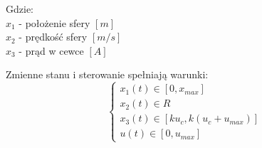 Gdzie:
\\$x_{1}$ - położenie sfery $[m]$
\\$x_{2}$ - prędkość sfery $[m/s]$
\\$x_{3}$ - prąd w cewce $[A]$ \newline

Zmienne stanu i sterowanie spełniają warunki:
\begin{equation}
\begin{cases}
x_1(t) \in [0, x_{max}] \\
x_2(t) \in R \\
x_3(t) \in [ku_c, k(u_c+u_{max})] \\
u(t) \in [0, u_{max}]
\end{cases}
\end{equation}




